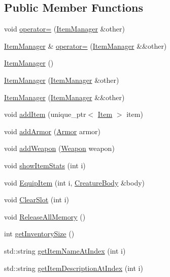 \subsection*{Public Member Functions}
\begin{DoxyCompactItemize}
\item 
void \mbox{\hyperlink{class_item_manager_a2fc75a7db020109a6a11d6db7e56a791}{operator=}} (\mbox{\hyperlink{class_item_manager}{Item\+Manager}} \&other)
\item 
\mbox{\hyperlink{class_item_manager}{Item\+Manager}} \& \mbox{\hyperlink{class_item_manager_abc96dcbccd0ed64290ea3c5297f87646}{operator=}} (\mbox{\hyperlink{class_item_manager}{Item\+Manager}} \&\&other)
\item 
\mbox{\hyperlink{class_item_manager_a1eab68c1b49e695ba96330da469b23cc}{Item\+Manager}} ()
\item 
\mbox{\hyperlink{class_item_manager_ac6399b407125cb2e7bb0733dca40c23c}{Item\+Manager}} (\mbox{\hyperlink{class_item_manager}{Item\+Manager}} \&other)
\item 
\mbox{\hyperlink{class_item_manager_a83c334430c14d31046389a6044f33511}{Item\+Manager}} (\mbox{\hyperlink{class_item_manager}{Item\+Manager}} \&\&other)
\item 
void \mbox{\hyperlink{class_item_manager_af86e2b751da18d6d142c29f8c4860323}{add\+Item}} (unique\+\_\+ptr$<$ \mbox{\hyperlink{class_item}{Item}} $>$ item)
\item 
void \mbox{\hyperlink{class_item_manager_af16502a871d116ebd2241cd8d2d745f5}{add\+Armor}} (\mbox{\hyperlink{class_armor}{Armor}} armor)
\item 
void \mbox{\hyperlink{class_item_manager_a2631fb34c48555098029e18e66d7eb05}{add\+Weapon}} (\mbox{\hyperlink{class_weapon}{Weapon}} weapon)
\item 
void \mbox{\hyperlink{class_item_manager_a865c3d2863ca55df09728514e4f6cd6d}{show\+Item\+Stats}} (int i)
\item 
void \mbox{\hyperlink{class_item_manager_a55d0009a402e2f5fc3a18cf0629cec64}{Equip\+Item}} (int i, \mbox{\hyperlink{class_creature_body}{Creature\+Body}} \&body)
\item 
void \mbox{\hyperlink{class_item_manager_a2aa35a782e14a35ad9477c512e256303}{Clear\+Slot}} (int i)
\item 
void \mbox{\hyperlink{class_item_manager_a70bf322ab676e3eb16850ddbcdf601d5}{Release\+All\+Memory}} ()
\item 
int \mbox{\hyperlink{class_item_manager_aba8fa0833328eacca5f55e16c5eb0fe9}{get\+Inventory\+Size}} ()
\item 
std\+::string \mbox{\hyperlink{class_item_manager_a60f99805e73cc978c02b1972dd988111}{get\+Item\+Name\+At\+Index}} (int i)
\item 
std\+::string \mbox{\hyperlink{class_item_manager_a93049d232e7c75f23b1f1356a586372b}{get\+Item\+Description\+At\+Index}} (int i)
\end{DoxyCompactItemize}
